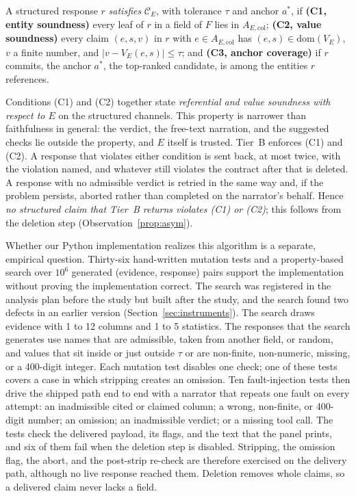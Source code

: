 \documentclass[smallextended,natbib]{svjour3}
\begin{document}
\begin{definition}\label{def:contract}
A structured response $r$ \emph{satisfies} $\mathcal{C}_E$, with tolerance
$\tau$ and anchor $a^*$, if \textbf{(C1, entity soundness)} every leaf of
$r$ in a field of $F$ lies in $A_{E,\mathrm{col}}$; \textbf{(C2, value
soundness)} every claim $(e,s,v)$ in $r$ with $e \in A_{E,\mathrm{col}}$ has
$(e,s) \in \mathrm{dom}(V_E)$, $v$ a finite number, and
$|v - V_E(e,s)| \le \tau$; and \textbf{(C3, anchor coverage)} if $r$
commits, the anchor $a^*$, the top-ranked candidate, is among the entities
$r$ references.
\end{definition}

Conditions (C1) and (C2) together state \emph{referential and value soundness
with respect to $E$} on the structured channels. This property is narrower
than faithfulness in general: the verdict, the free-text narration, and the
suggested checks lie outside the property, and $E$ itself is trusted. Tier~B
enforces (C1) and (C2). A response that violates either condition is sent
back, at most twice, with the violation named, and whatever still violates the
contract after that is deleted. A response with no admissible verdict is
retried in the same way and, if the problem persists, aborted rather than
completed on the narrator's behalf. Hence \emph{no structured claim that
Tier~B returns violates (C1) or (C2)}; this follows from the deletion step
(Observation~\ref{prop:asym}).

Whether our Python implementation realizes this algorithm is a separate,
empirical question. Thirty-six hand-written mutation tests and a
property-based search over $10^6$ generated (evidence, response) pairs support
the implementation without proving the implementation correct. The search was
registered in the analysis plan before the study but built after the study,
and the search found two defects in an earlier version
(Section~\ref{sec:instruments}). The search draws evidence with 1 to 12
columns and 1 to 5 statistics. The responses that the search generates use
names that are admissible, taken from another field, or random, and values
that sit inside or just outside $\tau$ or are non-finite, non-numeric,
missing, or a 400-digit integer. Each mutation test disables one check; one of
these tests covers a case in which stripping creates an omission. Ten
fault-injection tests then drive the shipped path end to end with a narrator
that repeats one fault on every attempt: an inadmissible cited or claimed
column; a wrong, non-finite, or 400-digit number; an omission; an
inadmissible verdict; or a missing tool call. The tests check the delivered
payload, its flags, and the text that the panel prints, and six of them fail
when the deletion step is disabled. Stripping, the omission flag, the abort,
and the post-strip re-check are therefore exercised on the delivery path,
although no live response reached them. Deletion removes whole claims, so a
delivered claim never lacks a field.
\end{document}
